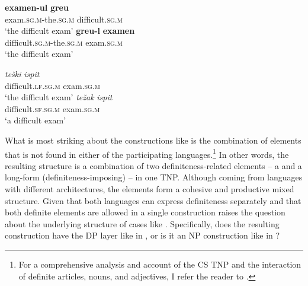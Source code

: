 \documentclass[output=paper,hidelinks,newtxmath,]{langscibook}
\begin{document}
\ea \label{15:ex12}
	\ea\label{15:ex12a}
    \gll \textbf{examen-ul} \textbf{greu}\\          
        exam\textsc{.sg.m}-the\textsc{.sg.m} difficult\textsc{.sg.m}\\
	\glt `the difficult exam'
	\ex\label{15:ex12b}
    \gll \textbf{greu-l} \textbf{examen}\\
         difficult\textsc{.sg.m}-the\textsc{.sg.m} exam\textsc{.sg.m}\\ 
	\glt `the difficult exam'
	\z
\z

\ea \label{15:ex13}
	\ea\label{15:ex13a}
    \gll \textit{teški} \textit{ispit}\\          
        difficult\textsc{.lf.sg.m} exam\textsc{.sg.m}\\
        \glt `the difficult exam'
	\ex\label{15:ex13b}
    \gll \textit{težak} \textit{ispit}\\
         difficult\textsc{.sf.sg.m} exam\textsc{.sg.m}\\ 
         \glt `a difficult exam'
	\z
\z

\noindent What is most striking about the constructions like  is the combination of elements that is not found in either of the participating languages.\footnote{\label{15:fn7}For a comprehensive analysis and account of the CS TNP and the interaction of  definite articles,  nouns, and  adjectives, I refer the reader to \citet{Petroj}.} In other words, the resulting structure is a combination of two definiteness-related elements -- a   and a  long-form (definiteness-imposing)  -- in one TNP. Although coming from languages with different architectures, the elements form a cohesive and productive mixed structure. Given that both languages can express definiteness separately and that both definite elements are allowed in a single construction raises the question about the underlying structure of cases like . Specifically, does the resulting construction have the DP layer like in , or is it an NP construction like in ?
\end{document}
